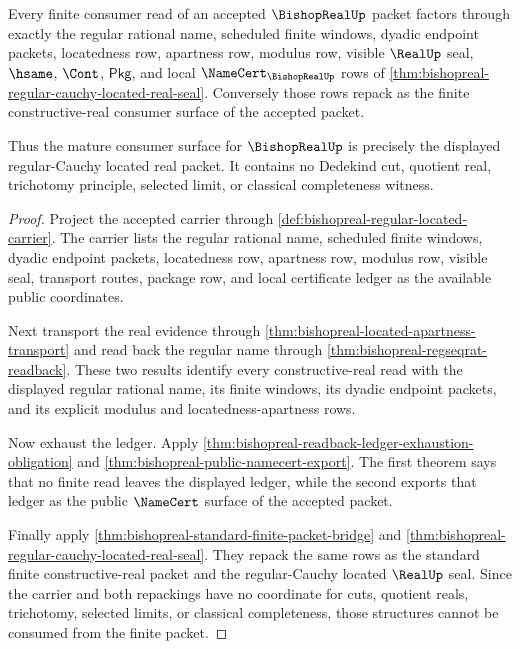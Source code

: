 \begin{theorem}
\label{thm:bishopreal-finite-constructive-real-consumer-completeness}
Every finite consumer read of an accepted $\BishopRealUp$ packet factors through
exactly the regular rational name, scheduled finite windows, dyadic endpoint
packets, locatedness row, apartness row, modulus row, visible $\RealUp$ seal,
$\hsame$, $\Cont$, $\mathsf{Pkg}$, and local $\NameCert_{\BishopRealUp}$ rows
of \autoref{thm:bishopreal-regular-cauchy-located-real-seal}. Conversely those
rows repack as the finite constructive-real consumer surface of the accepted
packet.

Thus the mature consumer surface for $\BishopRealUp$ is precisely the displayed
regular-Cauchy located real packet. It contains no Dedekind cut, quotient real,
trichotomy principle, selected limit, or classical completeness witness.
\end{theorem}
\begin{proof}
Project the accepted carrier through
\autoref{def:bishopreal-regular-located-carrier}. The carrier lists the
regular rational name, scheduled finite windows, dyadic endpoint packets,
locatedness row, apartness row, modulus row, visible seal, transport routes,
package row, and local certificate ledger as the available public coordinates.

Next transport the real evidence through
\autoref{thm:bishopreal-located-apartness-transport} and read back the regular
name through \autoref{thm:bishopreal-regseqrat-readback}. These two results
identify every constructive-real read with the displayed regular rational name,
its finite windows, its dyadic endpoint packets, and its explicit modulus and
locatedness-apartness rows.

Now exhaust the ledger. Apply
\autoref{thm:bishopreal-readback-ledger-exhaustion-obligation} and
\autoref{thm:bishopreal-public-namecert-export}. The first theorem says that no
finite read leaves the displayed ledger, while the second exports that ledger as
the public $\NameCert$ surface of the accepted packet.

Finally apply \autoref{thm:bishopreal-standard-finite-packet-bridge} and
\autoref{thm:bishopreal-regular-cauchy-located-real-seal}. They repack the same
rows as the standard finite constructive-real packet and the regular-Cauchy
located $\RealUp$ seal. Since the carrier and both repackings have no coordinate
for cuts, quotient reals, trichotomy, selected limits, or classical
completeness, those structures cannot be consumed from the finite packet.
\end{proof}

